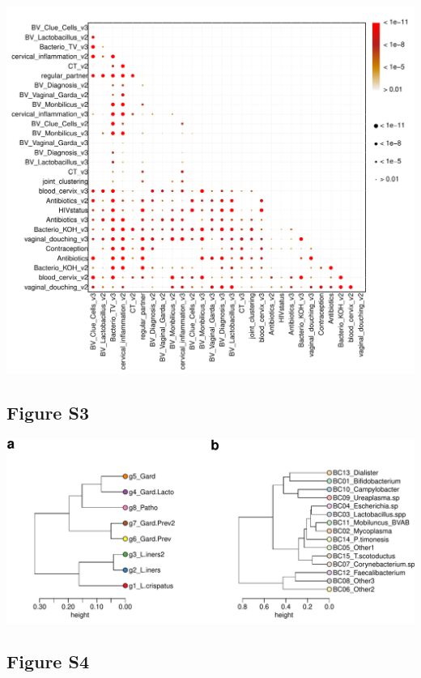 \documentclass[
]{article}
\begin{document}
\includegraphics[width=1\linewidth]{manuscript_template_files/figure-latex/unnamed-chunk-12-1}

\clearpage

\hypertarget{figure-s3}{%
\subsection{Figure S3}\label{figure-s3}}

\includegraphics[width=1\linewidth]{manuscript_template_files/figure-latex/unnamed-chunk-13-1}

\clearpage

\hypertarget{figure-s4}{%
\subsection{Figure S4}\label{figure-s4}}
\end{document}
